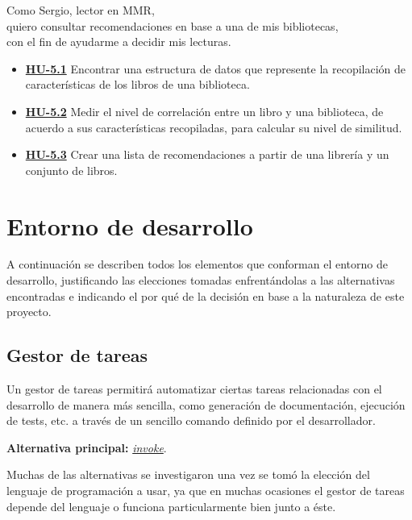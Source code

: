 \begin{itemize}
    Como Sergio, lector en MMR, \\
    quiero consultar recomendaciones en base a una de mis bibliotecas, \\
    con el fin de ayudarme a decidir mis lecturas.
    \begin{itemize}
        \item \href{https://github.com/Anglepi/My-Many-Reads/issues/66}{\textbf{HU-5.1}} Encontrar una estructura de datos que represente la recopilación de características de los libros de una biblioteca.
        \item \href{https://github.com/Anglepi/My-Many-Reads/issues/67}{\textbf{HU-5.2}} Medir el nivel de correlación entre un libro y una biblioteca, de acuerdo a sus características recopiladas, para calcular su nivel de similitud.
        \item \href{https://github.com/Anglepi/My-Many-Reads/issues/68}{\textbf{HU-5.3}} Crear una lista de recomendaciones a partir de una librería y un conjunto de libros.
    \end{itemize}
\end{itemize}

\section{Entorno de desarrollo}

A continuación se describen todos los elementos que conforman el entorno de desarrollo, justificando las elecciones tomadas enfrentándolas a las alternativas encontradas e indicando el por qué de la decisión en base a la naturaleza de este proyecto.

\subsection{Gestor de tareas}

Un gestor de tareas permitirá automatizar ciertas tareas relacionadas con el desarrollo de manera más sencilla, como generación de documentación, ejecución de tests, etc. a través de un sencillo comando definido por el desarrollador.


\textbf{Alternativa principal:} \href{https://www.pyinvoke.org/}{\textit{invoke}}.

Muchas de las alternativas se investigaron una vez se tomó la elección del lenguaje de programación a usar, ya que en muchas ocasiones el gestor de tareas depende del lenguaje o funciona particularmente bien junto a éste. 

